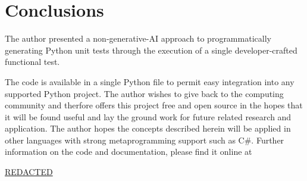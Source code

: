 \section{Conclusions}\label{sec:conclusions}

The author presented a non-generative-AI approach to 
programmatically generating Python unit tests through
the execution of a single developer-crafted functional test.

The code is available in a single Python file to permit 
easy integration into any supported Python project.
The author wishes to give back to the computing community
and therfore offers this project free and open source
in the hopes that it will be found useful and lay the ground
work for future related research and application.
The author hopes the concepts described herein will be 
applied in other languages with strong metaprogramming support
such as C\#.  Further information on the code and  documentation, please
find it online at
%
\begin{center}
  \url{REDACTED}
\end{center}


